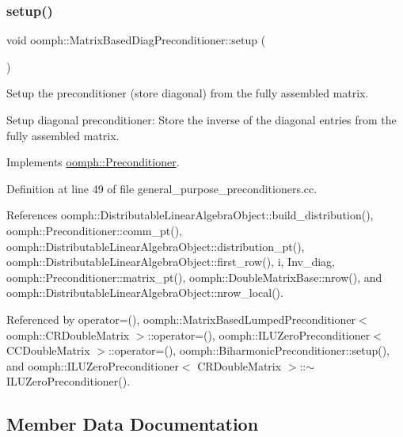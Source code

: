 \subsubsection{\texorpdfstring{setup()}{setup()}}
{\footnotesize\ttfamily void oomph\+::\+Matrix\+Based\+Diag\+Preconditioner\+::setup (\begin{DoxyParamCaption}{ }\end{DoxyParamCaption})\hspace{0.3cm}{\ttfamily [virtual]}}



Setup the preconditioner (store diagonal) from the fully assembled matrix. 

Setup diagonal preconditioner\+: Store the inverse of the diagonal entries from the fully assembled matrix. 

Implements \hyperlink{classoomph_1_1Preconditioner_af4886f4efe510e5c9b0eb19422943588}{oomph\+::\+Preconditioner}.



Definition at line 49 of file general\+\_\+purpose\+\_\+preconditioners.\+cc.



References oomph\+::\+Distributable\+Linear\+Algebra\+Object\+::build\+\_\+distribution(), oomph\+::\+Preconditioner\+::comm\+\_\+pt(), oomph\+::\+Distributable\+Linear\+Algebra\+Object\+::distribution\+\_\+pt(), oomph\+::\+Distributable\+Linear\+Algebra\+Object\+::first\+\_\+row(), i, Inv\+\_\+diag, oomph\+::\+Preconditioner\+::matrix\+\_\+pt(), oomph\+::\+Double\+Matrix\+Base\+::nrow(), and oomph\+::\+Distributable\+Linear\+Algebra\+Object\+::nrow\+\_\+local().



Referenced by operator=(), oomph\+::\+Matrix\+Based\+Lumped\+Preconditioner$<$ oomph\+::\+C\+R\+Double\+Matrix $>$\+::operator=(), oomph\+::\+I\+L\+U\+Zero\+Preconditioner$<$ C\+C\+Double\+Matrix $>$\+::operator=(), oomph\+::\+Biharmonic\+Preconditioner\+::setup(), and oomph\+::\+I\+L\+U\+Zero\+Preconditioner$<$ C\+R\+Double\+Matrix $>$\+::$\sim$\+I\+L\+U\+Zero\+Preconditioner().



\subsection{Member Data Documentation}
\mbox{\label{classoomph_1_1MatrixBasedDiagPreconditioner_a2d794c7cec62acb81ad2e93d49a401ed}} 
